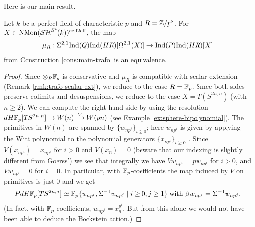 \documentclass{amsart}
\numberwithin{proposition}{section}
\numberwithin{equation}{section}
\def\cell{\mathrm{cell}}
\def\NMon{\mathrm{NMon}}
\def\dHFp{dH\F_p}
\begin{document}
Here is our main result.
\begin{theorem} \label{thm:homology-of-loops}
Let $k$ be a perfect field of characteristic $p$ and $R=\mathbb{Z}/p^\nu$.
For $X \in \NMon(\SH^{S^1}(k))^{\cell 2\eff}$, the map \[ \mu_R: \Sigma^{2,1}\mathrm{Ind}(Q)\mathrm{Ind}(HR)[\Omega^{2,1}(X)] \to \mathrm{Ind}(P) \mathrm{Ind}(HR)[X] \] from Construction \ref{cons:main-trafo} is an equivalence.
\end{theorem}
\begin{proof}
Since $\otimes_R \mathbb{F}_p$ is conservative and $\mu_R$ is compatible with scalar extension (Remark \ref{rmk:trafo-scalar-ext}), we reduce to the case $R=\mathbb{F}_p$.
Since both sides preserve colimits and desuspensions, we reduce to the case $X = T(S^{2n,n})$ (with $n \ge 2$).
We can compute the right hand side by using the resolution $\dHFp[TS^{2n,n}] \to W(n) \xrightarrow{V} W(pn)$ (see Example \ref{ex:sphere-bipolynomial}).
The primitives in $W(n)$ are spanned by $\{w_{np^i}\}_{i \ge 0}$; here $w_{np^i}$ is given by applying the Witt polynomial to the polynomial generators $\{x_{np^i}\}_{i \ge 0}$ \cite[p.4]{goerss-dieudonne}.
Since $V(x_{np^i}) = x_{np^i}$ for $i>0$ and $V(x_n) = 0$ \cite[Proposition 2.1]{goerss-dieudonne} (beware that our indexing is slightly different from Goerss') we see that integrally we have $Vw_{np^i} = pw_{np^i}$ for $i > 0$, and $Vw_{np^i} = 0$ for $i=0$.
In particular, with $\mathbb{F}_p$-coefficients the map induced by $V$ on primitives is just $0$ and we get \[ P \dHFp[TS^{2n,n}] \wequi \F_p\{w_{np^i}, \Sigma^{-1}w_{np^j} \mid i \ge 0, j \ge 1\} \text{ with } \beta w_{np^j} = \Sigma^{-1}w_{np^j}. \]
(In fact, with $\mathbb{F}_p$-coefficients, $w_{np^i} = x_n^{p^i}$.
But from this alone we would not have been able to deduce the Bockstein action.)


\end{proof}
\end{document}
